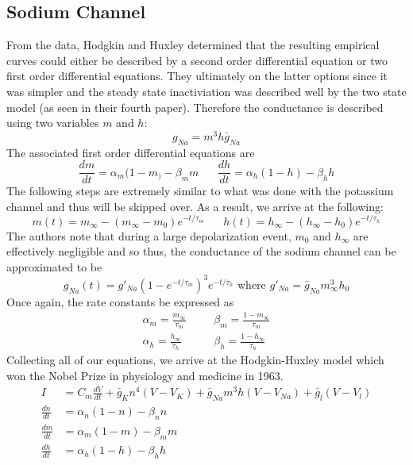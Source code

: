 \documentclass{article}
\newcommand{\od}[2]{\frac{d #1}{d #2}}
\numberwithin{equation}{section}
\begin{document}
\subsection{Sodium Channel}
From the data, Hodgkin and Huxley determined that the resulting empirical curves could either be described by a second order differential equation or two first order differential equations. They ultimately on the latter options since it was simpler and the steady state inactiviation was described well by the two state model (as seen in their fourth paper). Therefore the conductance is described using two variables $m$ and $h$:
\begin{equation}
    g_{Na} =m^3h\bar{g}_{Na} 
\end{equation}
The associated first order differential equations are 
\begin{equation}
    \od{m}{t} = \alpha_m (1-m_)-\beta_mm \hspace{20pt} \od{h}{t} = \alpha_h(1-h) -\beta_hh
\end{equation}
The following steps are extremely similar to what was done with the potassium channel and thus will be skipped over. As a result, we arrive at the following:
\begin{equation}
    m(t) = m_\infty -(m_\infty-m_0)e^{-t/\tau_m} \hspace{20pt} h(t) =h_\infty - (h_\infty-h_0)e^{-t/\tau_h}
\end{equation}
The authors note that during a large depolarization event, $m_0$ and $h_\infty$ are effectively negligible and so thus, the conductance of the sodium channel can be approximated to be 
\begin{equation}
    g_{Na} (t) = g'_{Na}(1-e^{-t/\tau_m})^3e^{-t/\tau_h} \text{ where } g'_{Na} = \bar{g}_{Na} m^3_\infty h_0
\end{equation}
Once again, the rate constants be expressed as 
\begin{equation}
\begin{split}
    \alpha_m = \frac{m_\infty}{\tau_m} \hspace{20pt}& \beta_m = \frac{1-m_\infty}{\tau_m} \\
    \alpha_h = \frac{h_\infty}{\tau_h} \hspace{20pt}& \beta_h = \frac{1-h_\infty}{\tau_h}
\end{split}    
\end{equation}
Collecting all of our equations, we arrive at the Hodgkin-Huxley model which won the Nobel Prize in physiology and medicine in 1963.
\begin{equation}
    \begin{split}
        I &= C_m\od{V}{t} +\bar{g}_Kn^4(V-V_K) +\bar{g}_{Na}m^3h(V-V_{Na})+\bar{g}_l(V-V_l) \\
        \od{n}{t} & =\alpha_n(1-n) - \beta_nn \\
        \od{m}{t} & = \alpha_m (1-m)-\beta_m m\\
        \od{h}{t} & = \alpha_h(1-h)-\beta_hh \label{eq:HH}
    \end{split}
\end{equation}
\end{document}
